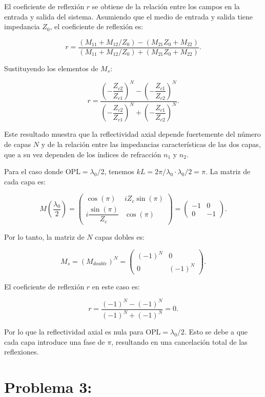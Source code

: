 \documentclass[11pt]{article}
\begin{document}
El coeficiente de reflexión \(r\) se obtiene de la relación entre los campos en la entrada y salida del sistema. Asumiendo que el medio de entrada y salida tiene impedancia \(Z_0\), el coeficiente de reflexión es:

\[
r = \frac{(M_{11} + M_{12}/Z_0) - (M_{21} Z_0 + M_{22})}{(M_{11} + M_{12}/Z_0) + (M_{21} Z_0 + M_{22})}.
\]

Sustituyendo los elementos de \(M_s\):

\[
r = \frac{\left(- \dfrac{Z_{c2}}{Z_{c1}}\right)^N - \left(- \dfrac{Z_{c1}}{Z_{c2}}\right)^N}{\left(- \dfrac{Z_{c2}}{Z_{c1}}\right)^N + \left(- \dfrac{Z_{c1}}{Z_{c2}}\right)^N}.
\]

Este resultado muestra que la reflectividad axial depende fuertemente del número de capas \(N\) y de la relación entre las impedancias características de las dos capas, que a su vez dependen de los índices de refracción \(n_1\) y \(n_2\).

Para el caso donde \(\mathrm{OPL} = \lambda_0/2\), tenemos \(kL = 2\pi/\lambda_0 \cdot \lambda_0/2 = \pi\). La matriz de cada capa es:

\[
M\left(\frac{\lambda_0}{2}\right) =
\begin{pmatrix}
\cos(\pi) & i Z_c \sin(\pi) \\[6pt]
i \dfrac{\sin(\pi)}{Z_c} & \cos(\pi)
\end{pmatrix} =
\begin{pmatrix}
-1 & 0 \\[6pt]
0 & -1
\end{pmatrix}.
\]

Por lo tanto, la matriz de \(N\) capas dobles es:

\[
M_s = (M_{double})^N =
\begin{pmatrix}
(-1)^N & 0 \\[6pt]
0 & (-1)^N
\end{pmatrix}.
\]

El coeficiente de reflexión \(r\) en este caso es:

\[
r = \frac{(-1)^N - (-1)^N}{(-1)^N
    + (-1)^N} = 0.
\]

Por lo que la reflectividad axial es nula para \(\mathrm{OPL} = \lambda_0/2\). Esto se debe a que cada capa introduce una fase de \(\pi\), resultando en una cancelación total de las reflexiones.

\section*{Problema 3:}
\end{document}
